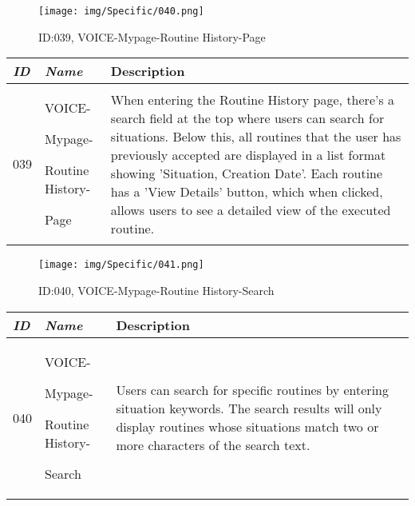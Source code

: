 \documentclass[conference]{IEEEtran}
\begin{document}
\begin{enumerate}[label=\arabic*]
    \vspace{2em}

    \begin{figure}[h]
        \centering
        \texttt{[image: img/Specific/040.png]}
        \caption{ID:039, VOICE-Mypage-Routine History-Page}
    \end{figure}

    \begin{table}[h]
    \def\arraystretch{1.2} \small
        \begin{tabular}{|p{1cm}|p{1.8cm}|p{4.8cm}|}
        \hline
            \textit{\textbf{ID}} & \textit{\textbf{Name}} & {\textbf{Description}} \\
        \hline
            039 \par & VOICE-\par Mypage-\par Routine History-\par Page & When entering the Routine History page, there's a search field at the top where users can search for situations. Below this, all routines that the user has previously accepted are displayed in a list format showing 'Situation, Creation Date'. Each routine has a 'View Details' button, which when clicked, allows users to see a detailed view of the executed routine. \\
        \hline
        \end{tabular}
    \end{table}

    \vspace{2em}

    \begin{figure}[h]
        \centering
        \texttt{[image: img/Specific/041.png]}
        \caption{ID:040, VOICE-Mypage-Routine History-Search}
    \end{figure}

    \begin{table}[h]
    \def\arraystretch{1.2} \small
        \begin{tabular}{|p{1cm}|p{1.8cm}|p{4.8cm}|}
        \hline
            \textit{\textbf{ID}} & \textit{\textbf{Name}} & {\textbf{Description}} \\
        \hline
            040 \par & VOICE-\par Mypage-\par Routine History-\par Search & Users can search for specific routines by entering situation keywords. The search results will only display routines whose situations match two or more characters of the search text. \\
        \hline
        \end{tabular}
    \end{table}
    

\end{enumerate}
\end{document}

